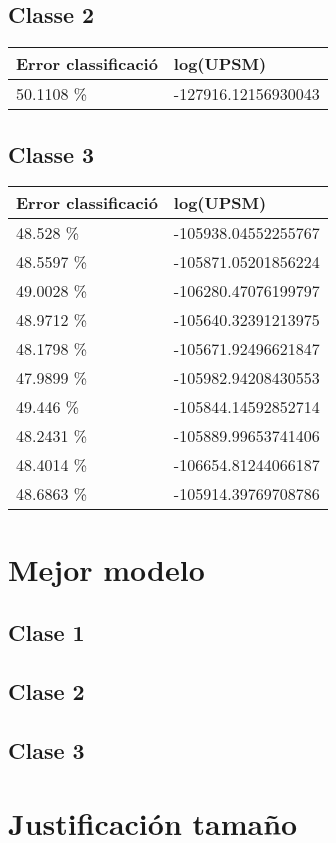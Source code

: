 \documentclass{article}
\begin{document}
\subsection{Classe 2}
\begin{table}[H]
\begin{tabular}{ll}
\hline
Error classificació & log(UPSM)           \\
\hline
50.1108 \%          & -127916.12156930043
\end{tabular}
\end{table}
\subsection{Classe 3}
\begin{table}[H]
\begin{tabular}{ll}
\hline
Error classificació & log(UPSM)           \\
\hline
48.528  \%          & -105938.04552255767 \\
48.5597 \%          & -105871.05201856224 \\
49.0028 \%          & -106280.47076199797 \\
48.9712 \%          & -105640.32391213975 \\
48.1798 \%          & -105671.92496621847 \\
47.9899 \%          & -105982.94208430553 \\
49.446  \%          & -105844.14592852714 \\
48.2431 \%          & -105889.99653741406 \\
48.4014 \%          & -106654.81244066187 \\
48.6863 \%          & -105914.39769708786
\end{tabular}
\end{table}
\section{Mejor modelo}
\subsection{Clase 1}
\subsection{Clase 2}
\subsection{Clase 3}

\section{Justificación tamaño}
\end{document}
